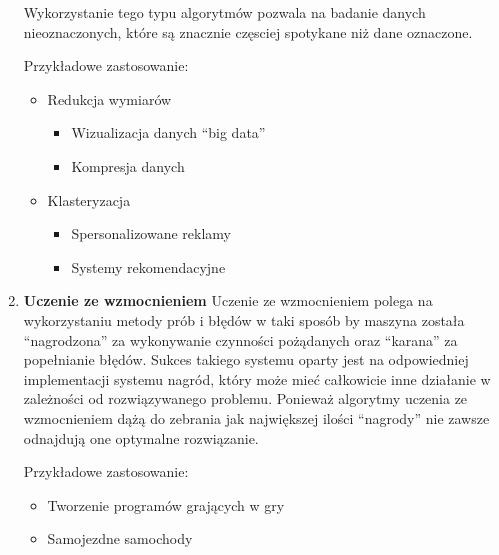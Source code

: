\begin{enumerate}
\begin{enumerate}
    \end{enumerate} 
    Wykorzystanie tego typu algorytmów pozwala na badanie danych nieoznaczonych,
    które są znacznie częsciej spotykane niż dane oznaczone.
    
    Przykładowe zastosowanie:
    \begin{itemize}
        \item Redukcja wymiarów
        \begin{itemize}
            \item Wizualizacja danych ``big data''
            \item Kompresja danych
        \end{itemize}
        \item Klasteryzacja
        \begin{itemize}
            \item Spersonalizowane reklamy
            \item Systemy rekomendacyjne
        \end{itemize}
    \end{itemize}
    \item \textbf{Uczenie ze wzmocnieniem}
    Uczenie ze wzmocnieniem polega na wykorzystaniu metody prób i błędów w taki sposób by maszyna została
    ``nagrodzona'' za wykonywanie czynności pożądanych oraz ``karana'' za popełnianie błędów. 
    Sukces takiego systemu oparty jest na odpowiedniej implementacji systemu nagród, który może 
    mieć całkowicie inne działanie w zależności od rozwiązywanego problemu. 
    Ponieważ algorytmy uczenia ze wzmocnieniem dążą do zebrania jak największej
    ilości ``nagrody'' nie zawsze odnajdują one optymalne rozwiązanie.
    
    Przykładowe zastosowanie:
    \begin{itemize}
        \item Tworzenie programów grających w gry
        \item Samojezdne samochody
    \end{itemize}
\end{enumerate} 

